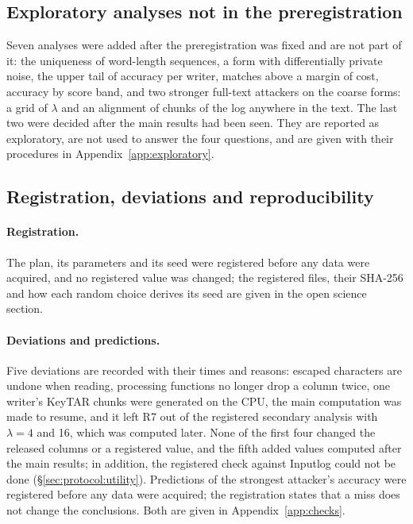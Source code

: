 \subsection{Exploratory analyses not in the preregistration}
\label{sec:protocol:exploratory}

Seven analyses were added after the preregistration was fixed and are not part of it: the uniqueness of word-length
sequences, a form with differentially private noise, the upper tail of accuracy per writer, matches above a margin of
cost, accuracy by score band, and two stronger full-text attackers on the coarse forms: a grid of $\lambda$ and an
alignment of chunks of the log anywhere in the text. The last two were decided after the main results had been seen.
They are reported as exploratory, are not used to answer the four questions, and
are given with their procedures in Appendix~\ref{app:exploratory}.

\subsection{Registration, deviations and reproducibility}
\label{sec:protocol:registration}

\paragraph{Registration.}
The plan, its parameters and its seed were registered before any data were acquired, and no registered value was
changed; the registered files, their SHA-256 and how each random choice derives its seed are given in the open science
section.

\paragraph{Deviations and predictions.}
Five deviations are recorded with their times and reasons: escaped characters are undone when reading, processing
functions no longer drop a column twice, one writer's KeyTAR chunks were generated on the CPU, the main computation
was made to resume, and it left R7 out of the registered secondary analysis with $\lambda = 4$ and 16, which was
computed later. None of the first four changed the released columns or a registered value, and the fifth added
values computed after the main results; in addition, the registered check against Inputlog could not be done (\S\ref{sec:protocol:utility}). Predictions of the strongest attacker's accuracy were registered before any data were acquired; the
registration states that a miss does not change the conclusions. Both are given in Appendix~\ref{app:checks}.
